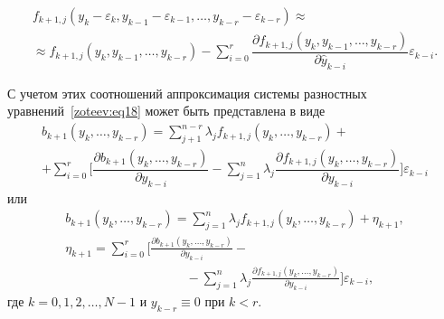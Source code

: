 \vspace{-5mm}

\begin{multline*}
f_{k+1,j}(y_k-\varepsilon_k,y_{k-1}-\varepsilon_{k-1},\dots, y_{k-r}-\varepsilon_{k-r})\approx \\
\approx f_{k+1,j}(y_k,y_{k-1},\dots,y_{k-r})-\sum_{i=0}^{r}\dfrac{\partial f_{k+1,j}(y_k,y_{k-1},\dots,y_{k-r})}{\partial \hat{y}_{k-i}}\varepsilon_{k-i}.
\end{multline*}


С учетом этих соотношений аппроксимация системы разностных уравнений~\eqref{zoteev:eq18} может быть представлена в виде
\begin{multline*}
b_{k+1}(y_k,\dots,y_{k-r})=\sum_{j+1}^{n-r} \lambda_j f_{k+1,j}(y_k,\dots,y_{k-r})+\\
+\sum_{i=0}^{r}
\biggl[\dfrac{\partial b_{k+1}(y_k,\dots,y_{k-r})}{\partial y_{k-i}}-\sum_{j=1}^n \lambda_j \dfrac{\partial f_{k+1,j}(y_k,\dots,y_{k-r})}{\partial y_{k-i}}\biggr]\varepsilon_{k-i}
\end{multline*}
или
\begin{equation}
\begin{array}{l}
b_{k+1}(y_k,\dots,y_{k-r}) = \sum_{j=1}^n \lambda_jf_{k+1,j}(y_k,\dots,y_{k-r})+\eta_{k+1}, \\[2mm]
\eta_{k+1}=\sum_{i=0}^{r}\Bigr[\frac{\partial b_{k+1}(y_k,\dots,y_{k-r})}{\partial y_{k-i}} - \\
\hspace{4cm}  -\sum_{j=1}^n \lambda_j \frac{\partial f_{k+1,j}(y_k,\dots,y_{k-r})}{\partial y_{k-i}}\Bigr]\varepsilon_{k-i}, 
\label{zoteev:eq19}
\end{array}
\end{equation}
где $ k=0,1,2,\dots,N-1$ и $y_{k-r}\equiv 0$ при $k<r$.

